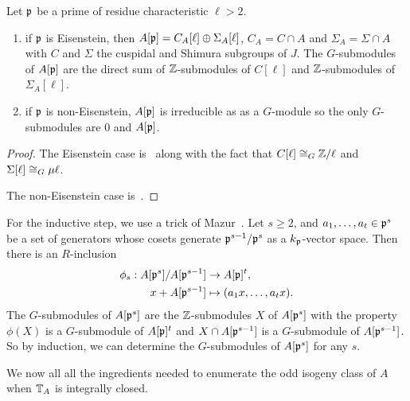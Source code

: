 \documentclass{article}
\begin{document}
\begin{proposition}[Mazur]\label{prop:all_G_subs}
    Let $\mathfrak{p}$ be a prime of residue characteristic $\ell>2$.
    \begin{enumerate}
        \item 
            if $\mathfrak{p}$ is Eisenstein, then $A[\mathfrak{p}]=C_A[\ell]\oplus \Sigma_A[\ell]$,
            $C_A=C\cap A$ and $\Sigma_A=\Sigma \cap A$ with $C$ and $\Sigma$
            the cuspidal and Shimura subgroups of $J$. The $G$-submodules of
            $A[\mathfrak{p}]$ are the direct sum of $\mathbb{Z}$-submodules of $C[\ell]$ and
            $\mathbb{Z}$-submodules of $\Sigma_A[\ell]$.
        \item
            if $\mathfrak{p}$ is non-Eisenstein, $A[\mathfrak{p}]$ is irreducible as as a
            $G$-module so the only $G$-submodules are $0$ and $A[\mathfrak{p}]$.
    \end{enumerate}
\end{proposition}
\begin{proof}
    The Eisenstein case is~\cite[Corollary 16.3]{mazur:eisenstein} along with
    the fact that $C[\ell]\cong_G \mathbb{Z}/\ell$ and $\Sigma[\ell]\cong_G \mu\ell$.

    The non-Eisenstein case is~\cite[Propositon 14.2]{mazur:eisenstein}.
\end{proof}

For the inductive step, we use a trick of Mazur~\cite[pg.
112]{mazur:eisenstein}. Let $s\geq 2$, and
$a_1,\ldots,a_t\in \mathfrak{p}^s$ be a set of generators whose cosets generate
$\mathfrak{p}^{s-1}/\mathfrak{p}^s$ as a $k_{\mathfrak{p}}$-vector space. Then there is an $R$-inclusion
\begin{align*}
    \phi_s: A[\mathfrak{p}^s]/A[\mathfrak{p}^{s-1}] & \to A[\mathfrak{p}]^t, \\
    x+A[\mathfrak{p}^{s-1}] & \mapsto (a_1x,\ldots,a_tx).
\end{align*}
The $G$-submodules of $A[\mathfrak{p}^s]$ are the $\mathbb{Z}$-submodules $X$ of $A[\mathfrak{p}^s]$ with
the property $\phi(X)$ is a $G$-submodule of $A[\mathfrak{p}]^t$ and $X\cap A[\mathfrak{p}^{s-1}]$
is a $G$-submodule of $A[\mathfrak{p}^{s-1}]$. So by induction, we can determine the
$G$-submodules of $A[\mathfrak{p}^s]$ for any $s$. 

We now all all the ingredients needed to enumerate the odd isogeny class of
$A$ when $\mathbb{T}_A$ is integrally closed.



\end{document}
